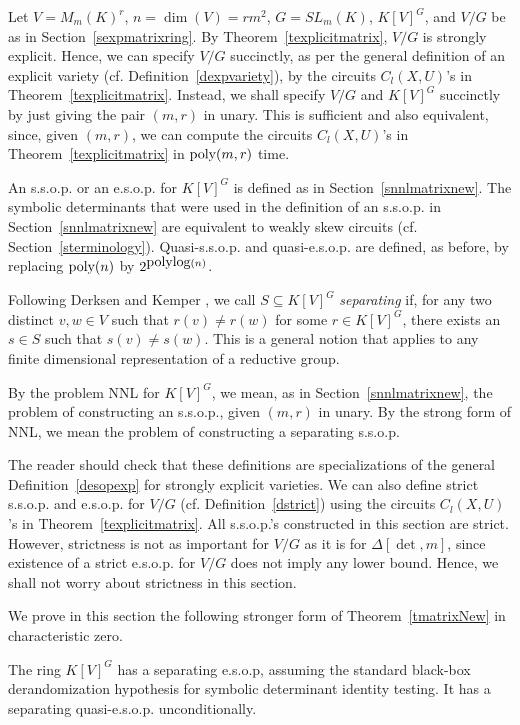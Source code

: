\documentclass[11pt]{article}
\begin{document}
Let $V=M_m(K)^r$, $n=\dim(V)=r m^2$,  $G=SL_m(K)$, $K[V]^G$, and $V/G$  be as in Section~\ref{sexpmatrixring}. 
By Theorem~\ref{texplicitmatrix}, $V/G$ is strongly  explicit. 
Hence, we can specify $V/G$ succinctly, as per the general definition of an explicit variety 
(cf. Definition~\ref{dexpvariety}), by  the circuits $C_l(X,U)$'s in 
Theorem~\ref{texplicitmatrix}. Instead,
we shall  specify $V/G$ and $K[V]^G$  succinctly by just giving the pair $(m,r)$ in unary. This is sufficient and also equivalent,
since, given $(m,r)$, we can compute the circuits $C_l(X,U)$'s in Theorem~\ref{texplicitmatrix} in ${\mbox {poly}}(m,r)$ time. 

An s.s.o.p. or an e.s.o.p. for $K[V]^G$ 
is defined as in Section~\ref{snnlmatrixnew}. The symbolic determinants that
were used in the definition of an s.s.o.p. in Section~\ref{snnlmatrixnew} are equivalent to weakly skew circuits 
(cf. Section~\ref{sterminology}). Quasi-s.s.o.p. and quasi-e.s.o.p. are   defined, as before,
 by replacing ${\mbox {poly}}(n)$ by $2^{{\mbox {polylog}}(n)}$.

Following Derksen and Kemper \cite{derksenbook},
we call $S \subseteq K[V]^G$ {\em separating} if,
for any two distinct $v,w \in V$ such that $r(v)\not = r(w)$ for some $r \in K[V]^G$, there exists an $s \in S$
such that $s(v) \not = s(w)$. This is a general notion that applies to
any finite dimensional representation  of a reductive group.

By the  problem NNL for $K[V]^G$, we mean, as in Section~\ref{snnlmatrixnew},
the problem of constructing an
s.s.o.p., given $(m,r)$ in unary.
By the strong form of NNL, we mean the problem of constructing a separating
s.s.o.p.


The reader  should check that these definitions are specializations of the general 
Definition~\ref{desopexp} for strongly explicit varieties.
We can also define strict s.s.o.p. and e.s.o.p. for $V/G$ (cf. Definition~\ref{dstrict}) 
using the circuits $C_l(X,U)$'s in Theorem~\ref{texplicitmatrix}.
All s.s.o.p.'s constructed in this section are strict. However, strictness is not as important for $V/G$ as it is for $\Delta[\det,m]$,
since existence of a strict e.s.o.p. for  $V/G$ does not imply any lower bound. 
Hence, we shall not worry about strictness in this section.


We   prove in this section the following stronger form of Theorem~\ref{tmatrixNew} in characteristic zero.

\begin{theorem} \label{tmatrixstrongform}
The ring  $K[V]^G$ has a separating e.s.o.p,
assuming the standard  black-box derandomization hypothesis for symbolic determinant identity testing. 
It has a separating quasi-e.s.o.p. unconditionally.
\end{theorem}
\end{document}
